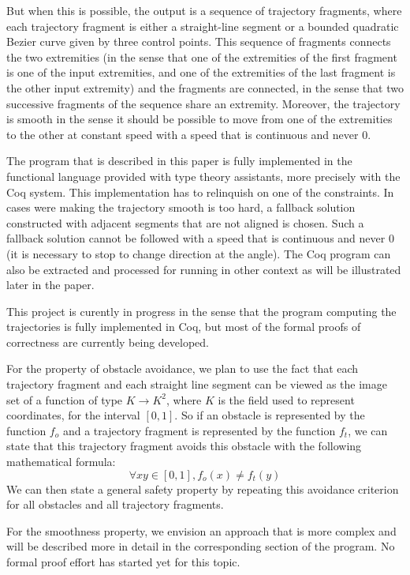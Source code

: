 \documentclass{easychair}
\begin{document}
But when this is possible, the output is a sequence of trajectory
fragments, where each trajectory
fragment is either a straight-line segment or a bounded quadratic Bezier
curve given by three control points.  This sequence of fragments connects
the two extremities (in the sense that one of the extremities of the
first fragment is one of the input extremities, and one of the
extremities of the last fragment is the other input extremity) and the
fragments are connected, in the sense that two successive fragments of
the sequence share an extremity.  Moreover, the trajectory is smooth
in the sense it should be possible to move from one
of the extremities to the other at constant speed with a speed that is
continuous and never 0.

The program that is described in this paper is fully implemented in the
functional language provided with type theory assistants, more precisely
with the Coq system.  This implementation has to relinquish on one of
the constraints.  In cases were making the trajectory smooth is too hard,
a fallback solution constructed with adjacent segments that are not
aligned is chosen.  Such a fallback solution cannot be followed with a
speed that is continuous and never 0 (it is necessary to stop to change
direction at the angle).  The Coq program can also be extracted and
processed for running in other context as will be illustrated later in
the paper.

This project is curently in progress in the sense that the program
computing the trajectories is fully implemented in Coq, but most of the
formal proofs of correctness are currently being developed.

For the property of obstacle avoidance, we plan to use the fact that
each trajectory fragment and each straight line segment can be viewed
as the image set of a function of type \(K \rightarrow K^2\), where \(K\) is
the field used to
represent coordinates, for the interval \([0,1]\).  So if an obstacle is
represented by the function \(f_o\) and a trajectory fragment is
represented by the function \(f_t\), we can state that this trajectory
fragment avoids this obstacle with the following mathematical formula:
\[\forall x y \in [0,1], f_o(x) \neq f_t(y)\]
We can then state a general safety property by repeating this avoidance
criterion for all obstacles and all trajectory fragments.

For the smoothness property, we envision an approach that is more
complex and will be described more in detail in the corresponding section
of the program.  No formal proof effort has started yet for this topic.
\end{document}

